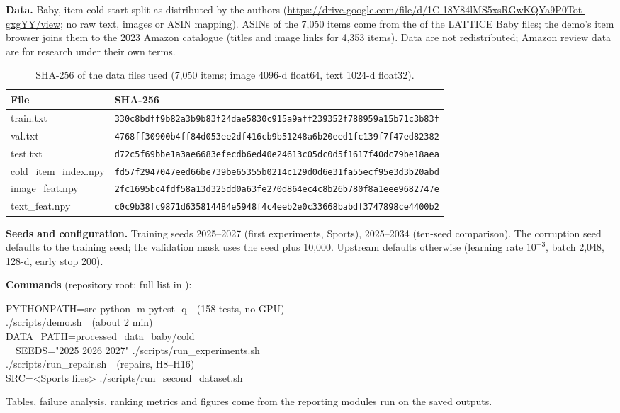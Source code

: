 \documentclass[conference]{IEEEtran}
\newcommand{\code}[1]{\texttt{\detokenize{#1}}}
\begin{document}
\textbf{Data.} Baby, item cold-start split as distributed by the authors (\url{https://drive.google.com/file/d/1C-18Y84lMS5xsRGwKQYa9P0Tot-gxgYY/view}; no raw text, images or ASIN mapping). ASINs of the 7,050 items come from the \code{item\_list.txt} of the LATTICE Baby files; the demo's item browser joins them to the 2023 Amazon catalogue (titles and image links for 4,353 items). Data are not redistributed; Amazon review data are for research under their own terms.

\begin{table}[!h]
\centering\tiny\setlength{\tabcolsep}{1pt}
\caption{SHA-256 of the data files used (7,050 items; image 4096-d float64, text 1024-d float32).}
\begin{tabular}{@{}ll@{}}
\toprule
File & SHA-256 \\
\midrule
train.txt & \texttt{330c8bdff9b82a3b9b83f24dae5830c915a9aff239352f788959a15b71c3b83f} \\
val.txt & \texttt{4768ff30900b4ff84d053ee2df416cb9b51248a6b20eed1fc139f7f47ed82382} \\
test.txt & \texttt{d72c5f69bbe1a3ae6683efecdb6ed40e24613c05dc0d5f1617f40dc79be18aea} \\
cold\_item\_index.npy & \texttt{fd57f2947047eed66be739be65355b0214c129d0d6e31fa55ecf95e3d3b20abd} \\
image\_feat.npy & \texttt{2fc1695bc4fdf58a13d325dd0a63fe270d864ec4c8b26b780f8a1eee9682747e} \\
text\_feat.npy & \texttt{c0c9b38fc9871d635814484e5948f4c4eeb2e0c33668babdf3747898ce4400b2} \\
\bottomrule
\end{tabular}
\end{table}

\textbf{Seeds and configuration.} Training seeds 2025--2027 (first experiments, Sports), 2025--2034 (ten-seed comparison). The corruption seed defaults to the training seed; the validation mask uses the seed plus 10,000. Upstream defaults otherwise (learning rate $10^{-3}$, batch 2,048, 128-d, early stop 200).

\textbf{Commands} (repository root; full list in \code{docs/reproducibility.md}):
{\raggedright\scriptsize\ttfamily
PYTHONPATH=src python -m pytest -q\ \ (158 tests, no GPU)\\
./scripts/demo.sh\ \ (about 2 min)\\
DATA\_PATH=processed\_data\_baby/cold\\
\ \ SEEDS="2025 2026 2027" ./scripts/run\_experiments.sh\\
./scripts/run\_repair.sh\ \ (repairs, H8--H16)\\
SRC=<Sports files> ./scripts/run\_second\_dataset.sh\par}
Tables, failure analysis, ranking metrics and figures come from the reporting modules run on the saved outputs.
\end{document}
